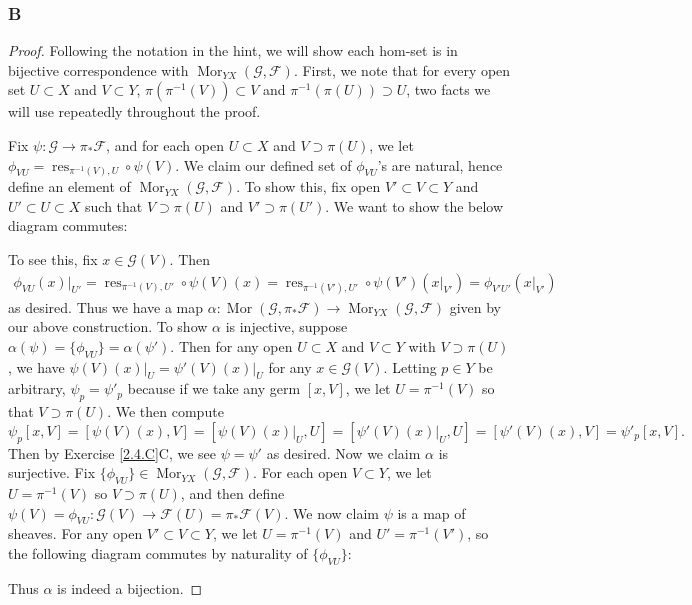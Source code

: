 \documentclass{article}
\newcommand{\fF}{\mathscr{F}}
\newcommand{\fG}{\mathscr{G}}
\DeclareMathOperator{\res}{res}
\DeclareMathOperator{\Mor}{Mor}
\begin{document}
\subsubsection{B}\label{2.7.B}
\begin{proof}
    Following the notation in the hint, we will show each hom-set is in bijective correspondence with $\Mor_{YX}(\fG,\fF)$. First, we note that for every open set $U\subset X$ and $V\subset Y$, $\pi(\pi^{-1}(V))\subset V$ and $\pi^{-1}(\pi(U))\supset U$, two facts we will use repeatedly throughout the proof.
    
    Fix $\psi:\fG\to \pi_* \fF$, and for each open $U\subset X$ and $V\supset \pi(U)$, we let $\phi_{VU} = \res_{\pi^{-1}(V),U} \circ \psi(V)$. We claim our defined set of $\phi_{VU}$'s are natural, hence define an element of $\Mor_{YX}(\fG,\fF)$. To show this, fix open $V'\subset V\subset Y$ and $U'\subset U\subset X$ such that $V\supset \pi(U)$ and $V'\supset \pi(U')$. We want to show the below diagram commutes:
    \begin{center}
    \end{center}
    To see this, fix $x\in \fG(V)$. Then 
    \begin{align*}
         \phi_{VU}(x)\vert_{U'} = \res_{\pi^{-1}(V), U'} \circ \psi(V) (x)=\res_{\pi^{-1}(V'),U'}\circ \psi(V')(x\vert_{V'})=\phi_{V'U'}(x\vert_{V'})
    \end{align*}
    as desired. Thus we have a map $\alpha:\Mor(\fG,\pi_* \fF)\to \Mor_{YX}(\fG,\fF)$ given by our above construction. To show $\alpha$ is injective, suppose $\alpha(\psi) = \{\phi_{VU}\} = \alpha(\psi')$. Then for any open $U\subset X$ and $V\subset Y$ with $V\supset \pi(U)$, we have $\psi(V)(x)\vert_U = \psi'(V)(x)\vert_U$ for any $x\in \fG(V)$. Letting $p\in Y$ be arbitrary, $\psi_p=\psi'_p$ because if we take any germ $[x,V]$, we let $U=\pi^{-1}(V)$ so that $V\supset \pi(U)$. We then compute
    \[
    \psi_p[x,V] = [\psi(V)(x), V] = [\psi(V)(x)\vert_U,U]=[\psi'(V)(x)\vert_U,U]=[\psi'(V)(x),V]=\psi'_p[x,V].
    \]
    Then by Exercise \ref{2.4.C}C, we see $\psi=\psi'$ as desired. Now we claim $\alpha$ is surjective. Fix $\{\phi_{VU}\} \in \Mor_{YX}(\fG,\fF)$. For each open $V\subset Y$, we let $U=\pi^{-1}(V)$ so $V\supset \pi(U)$, and then define $\psi(V)=\phi_{VU}:\fG(V)\to \fF(U)=\pi_*\fF(V)$. We now claim $\psi$ is a map of sheaves. For any open $V'\subset V\subset Y$, we let $U=\pi^{-1}(V)$ and $U'=\pi^{-1}(V')$, so the following diagram commutes by naturality of $\{\phi_{VU}\}$:
    \begin{center}
    \end{center}
    Thus $\alpha$ is indeed a bijection.


\end{proof}
\end{document}
